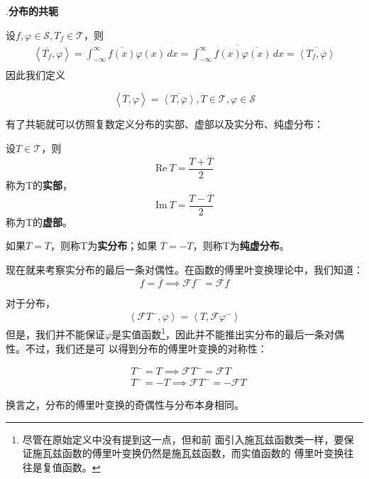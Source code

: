 .\textbf{分布的共轭}

设$f,\varphi\in\mathcal{S} ,T_f\in\mathcal{T} $，则
\begin{align*}
    \left\langle \overline{T_f},\varphi\right\rangle=\int_{-\infty}^{\infty}\overline{f(x)}\varphi(x)\,dx=\overline{\int_{-\infty}^{\infty}f(x)\overline{\varphi(x)}\,dx}=\overline{\left\langle T_f,\overline{\varphi}\right\rangle} \\
\end{align*}
因此我们定义\begin{definition}[分布的共轭]
    \begin{equation*}
    \left\langle \overline{T},\varphi\right\rangle=\overline{\left\langle T,\overline{\varphi}\right\rangle},T\in\mathcal{T} ,\varphi\in\mathcal{S}
\end{equation*}
\end{definition}

有了共轭就可以仿照复数定义分布的实部、虚部以及实分布、纯虚分布：
\begin{definition}[分布的实部、虚部]
    设$T\in\mathcal{T} $，则
    \[\text{Re}\ T=\frac{T+\overline{T}}{2}\]
    称为T的\textbf{实部}，
    \[\text{Im}\ T=\frac{T-\overline{T}}{2}\]
    称为T的\textbf{虚部}。
\end{definition}
\begin{definition}[实分布与纯虚分布]
如果$\overline{T}=T$，则称T为\textbf{实分布}；如果
$\overline{T}=-T$，则称T为\textbf{纯虚分布}。
\end{definition}
现在就来考察实分布的最后一条对偶性。在函数的傅里叶变换理论中，我们知道：
    \[f=\overline{f}\implies \mathcal{F}f^- =\overline{\mathcal{F} f}\]

对于分布，
\begin{align*}
    \left\langle\mathcal{F}T^-,\varphi\right\rangle =\left\langle T,\mathcal{F}\varphi^-\right\rangle
\end{align*}
但是，我们并不能保证$\varphi$是实值函数\footnote{尽管在原始定义中没有提到这一点，但和前
    面引入施瓦兹函数类一样，要保证施瓦兹函数的傅里叶变换仍然是施瓦兹函数，而实值函数的
    傅里叶变换往往是复值函数。}，因此并不能推出实分布的最后一条对偶性。不过，我们还是可
以得到分布的傅里叶变换的对称性：
\begin{theorem}[分布的傅里叶变换的对称性]
    \begin{align*}
    &T^-=T\implies\mathcal{F} T^-=\mathcal{F} T \\
    &T^-=-T\implies\mathcal{F} T^-=-\mathcal{F} T
\end{align*}
\end{theorem}
换言之，分布的傅里叶变换的奇偶性与分布本身相同。


